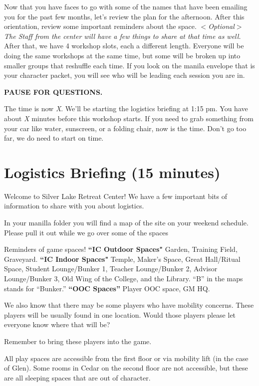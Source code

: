 \documentclass[green]{GL2020}
\begin{document}
Now that you have faces to go with some of the names that have been emailing you for the past few months, let’s review the plan for the afternoon. After this orientation, review some important reminders about the space. \emph{$<$Optional$>$ The Staff from the center will have a few things to share at that time as well.} After that, we have 4 workshop slots, each a different length. Everyone will be doing the same workshops at the same time, but some will be broken up into smaller groups that reshuffle each time. If you look on the manila envelope that is your character packet, you will see who will be leading each session you are in. 

\textbf{PAUSE FOR QUESTIONS.}

The time is now \emph{X}. We'll be starting the logistics briefing at 1:15 pm. You have about \emph{X} minutes before this workshop starts. If you need to grab something from your car like water, sunscreen, or a folding chair, now is the time. Don't go too far, we do need to start on time.

\section*{Logistics Briefing (15 minutes)}

Welcome to Silver Lake Retreat Center!  We have a few important bits of information to share with you about logistics.

In your manilla folder you will find a map of the site on your weekend schedule.  Please pull it out while we go over some of the spaces

Reminders of game spaces!
\textbf{``IC Outdoor Spaces"} Garden, Training Field, Graveyard. 
\textbf{``IC Indoor Spaces"} Temple, Maker's Space, Great Hall/Ritual Space, Student Lounge/Bunker 1, Teacher Lounge/Bunker 2, Advisor Lounge/Bunker 3, Old Wing of the College, and the Library. “B” in the maps stands for “Bunker.”
\textbf{``OOC Spaces''} Player OOC space, GM HQ.

We also know that there may be some players who have mobility concerns.  These players will be usually found in one location.  Would those players please let everyone know where that will be?

Remember to bring these players into the game.  

All play spaces are accessible from the first floor or via mobility lift (in the case of Glen).  Some rooms in Cedar on the second floor are not accessible, but these are all sleeping spaces that are out of character.
\end{document}
